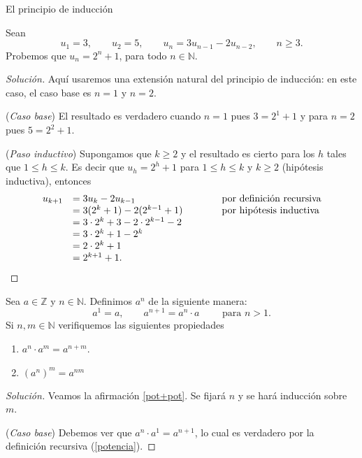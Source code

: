 \begin{section}{El principio de inducción}
\begin{ejemplo*}
Sean $$u_1 = 3,\qquad u_2 = 5,\qquad u_n = 3u_{n-1}- 2u_{n-2},\qquad  n \ge 3.$$
Probemos que $u_n = 2^n + 1$, para todo $n \in  \mathbb N$.
\begin{proof}[Solución] Aquí usaremos una extensión natural del principio de inducción: en este caso, el caso base es $n=1$ y $n=2$.

\noindent(\textit{Caso  base}) El resultado es verdadero cuando $n= 1$ pues $3 = 2^1+1$ y para $n=2$ pues $ 5 =2^2+1$.

\noindent (\textit{Paso  inductivo}) Supongamos que $k \ge 2$ y el resultado  es cierto para los $h$ tales que  $1 \le h \le k$. Es decir que $u_h = 2^h+1$ para $1 \le h \le k$ y $k \ge 2$ (hipótesis inductiva), entonces
$$
\begin{matrix} u_{k+1} &= 3u_k -2u_{k-1} \hfill &\qquad &\text{por definición recursiva} \hfill \\
&= 3(2^k+1)-2(2^{k-1}+1) \hfill &\qquad &\text{por hipótesis inductiva}\hfill \\
&= 3\cdot 2^k+3-2\cdot 2^{k-1}-2 \hfill &\qquad & \\
&= 3\cdot 2^k+1- 2^{k} \hfill &\qquad & \\
&= 2\cdot 2^k+1 \hfill &\qquad & \\
&= 2^{k+1}+1. \hfill &\qquad & 
\end{matrix}
$$
\end{proof}
\end{ejemplo*}


\begin{ejemplo*}
Sea $a \in \mathbb Z$ y $n \in \mathbb N$. Definimos $a^n$ de la siguiente manera:
\begin{equation}\label{potencia}
a^1 = a, \qquad a^{n+1} = a^{n}\cdot a \qquad \text{ para $n >1$.}
\end{equation}
Si $n,m \in \mathbb N$ verifiquemos las siguientes propiedades

\begin{enumerate}[label=\textit{\alph*)}]
\item \label{pot+pot} $a^{n} \cdot a^m = a^{n+m}$.
\item \label{potpot} $(a^n)^m = a^{nm}$
\end{enumerate}
\end{ejemplo*}
\begin{proof}[Solución] 
    Veamos la afirmación \ref{pot+pot}. Se fijará $n$ y se hará inducción sobre $m$. 
    
    \noindent(\textit{Caso  base}) Debemos ver que $a^{n} \cdot a^1 = a^{n+1}$, lo cual es verdadero por la definición recursiva (\ref{potencia}). 
    

\end{proof}
\end{section}
